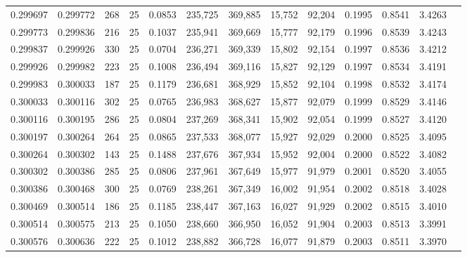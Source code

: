 \begin{tabular}{rrrrrrrrrrrrr}
0.299697 & 0.299772 &   268 &  25 &                                     0.0853 & 235,725 & 369,885 &  15,752 &  92,204 & 0.1995 & 0.8541 & 3.4263 \\
0.299773 & 0.299836 &   216 &  25 &                                     0.1037 & 235,941 & 369,669 &  15,777 &  92,179 & 0.1996 & 0.8539 & 3.4243 \\
0.299837 & 0.299926 &   330 &  25 &                                     0.0704 & 236,271 & 369,339 &  15,802 &  92,154 & 0.1997 & 0.8536 & 3.4212 \\
0.299926 & 0.299982 &   223 &  25 &                                     0.1008 & 236,494 & 369,116 &  15,827 &  92,129 & 0.1997 & 0.8534 & 3.4191 \\
0.299983 & 0.300033 &   187 &  25 &                                     0.1179 & 236,681 & 368,929 &  15,852 &  92,104 & 0.1998 & 0.8532 & 3.4174 \\
0.300033 & 0.300116 &   302 &  25 &                                     0.0765 & 236,983 & 368,627 &  15,877 &  92,079 & 0.1999 & 0.8529 & 3.4146 \\
0.300116 & 0.300195 &   286 &  25 &                                     0.0804 & 237,269 & 368,341 &  15,902 &  92,054 & 0.1999 & 0.8527 & 3.4120 \\
0.300197 & 0.300264 &   264 &  25 &                                     0.0865 & 237,533 & 368,077 &  15,927 &  92,029 & 0.2000 & 0.8525 & 3.4095 \\
0.300264 & 0.300302 &   143 &  25 &                                     0.1488 & 237,676 & 367,934 &  15,952 &  92,004 & 0.2000 & 0.8522 & 3.4082 \\
0.300302 & 0.300386 &   285 &  25 &                                     0.0806 & 237,961 & 367,649 &  15,977 &  91,979 & 0.2001 & 0.8520 & 3.4055 \\
0.300386 & 0.300468 &   300 &  25 &                                     0.0769 & 238,261 & 367,349 &  16,002 &  91,954 & 0.2002 & 0.8518 & 3.4028 \\
0.300469 & 0.300514 &   186 &  25 &                                     0.1185 & 238,447 & 367,163 &  16,027 &  91,929 & 0.2002 & 0.8515 & 3.4010 \\
0.300514 & 0.300575 &   213 &  25 &                                     0.1050 & 238,660 & 366,950 &  16,052 &  91,904 & 0.2003 & 0.8513 & 3.3991 \\
0.300576 & 0.300636 &   222 &  25 &                                     0.1012 & 238,882 & 366,728 &  16,077 &  91,879 & 0.2003 & 0.8511 & 3.3970 \\

\end{tabular}
